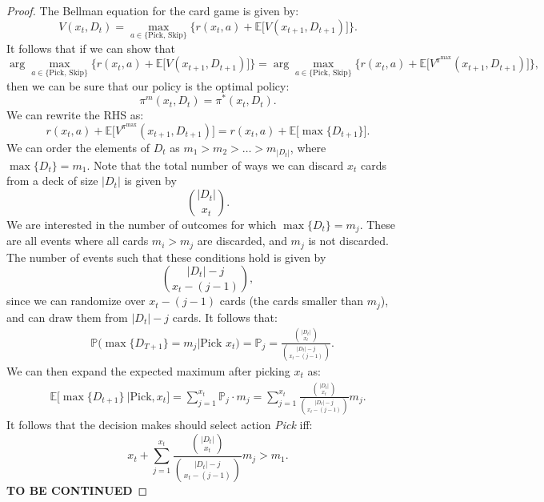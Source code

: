 \documentclass{article}
\begin{document}
\begin{proof}
    The Bellman equation for the card game is given by:
    \begin{equation}
        V(x_t, D_t) =  \max_{a \in \{\text{Pick, Skip}\}}\Big\{r(x_t,a) + \mathbb{E}\Big[V(x_{t+1}, D_{t+1})\Big]\Big\}.
    \end{equation}
    It follows that if we can show that
    \begin{equation}
        \arg \max_{a \in \{\text{Pick, Skip}\}}\Big\{r(x_t,a) + \mathbb{E}\Big[V(x_{t+1}, D_{t+1})\Big]\Big\} = \arg \max_{a \in \{\text{Pick, Skip}\}}\Big\{r(x_t,a) + \mathbb{E}\Big[V^{\pi^{\max}}(x_{t+1}, D_{t+1})\Big]\Big\},
    \end{equation}
    then  we can be sure that our policy is the optimal policy:
    \begin{equation}
        \pi^m(x_t, D_t) = \pi^*(x_t, D_t).
    \end{equation}
    We can rewrite the RHS as:
    \begin{equation}
        r(x_t,a) + \mathbb{E}\Big[V^{\pi^{\max}}(x_{t+1}, D_{t+1})\Big] = r(x_t,a) + \mathbb{E}\big[\max\{D_{t+1}\}\big].
    \end{equation}
    We can order the elements of $D_t$ as $m_1 > m_2 > \dots > m_{|D_t|}$, where $\max\{D_t\} = m_1$.
    Note that the total number of ways we can discard $x_t$ cards from a deck of size $|D_t|$ is given by
    \begin{equation}
        \binom{|D_t|}{x_t}.
    \end{equation}
    We are interested in the number of outcomes for which $\max\{D_t\}=m_j$. These are all events where all cards $m_i>m_j$ are discarded, and $m_j$ is not discarded. The number of events such that these conditions hold is given by
    \begin{equation}
        \binom{|D_t|-j}{x_t-(j-1)},
    \end{equation}
    since we can randomize over $x_t-(j-1)$ cards (the cards smaller than $m_j$), and can draw them from $|D_t|-j$ cards. It follows that:
    \begin{align}
         & \mathbb{P}\Big(\max\{D_{T+1}\}  = m_j \big| \text{Pick } x_t\Big) = \mathbb{P}_j  = \frac{\binom{|D_t|}{x_t}}{\binom{|D_t|-j}{x_t-(j-1)}} .
    \end{align}
    We can then expand the expected maximum after picking $x_t$ as:
    \begin{align}
        \mathbb{E}\big[\max\{D_{t+1}\} \ | \text{Pick}, x_t\big] = \sum^{x_t}_{j=1} \mathbb{P}_j\cdot m_j = \sum^{x_t}_{j=1} \frac{\binom{|D_t|}{x_t}}{\binom{|D_t|-j}{x_t-(j-1)}}  m_j.
    \end{align}
    It follows that the decision makes should select action \textit{Pick} iff:
    \begin{equation}
        x_t+ \sum^{x_t}_{j=1} \frac{\binom{|D_t|}{x_t}}{\binom{|D_t|-j}{x_t-(j-1)}}  m_j > m_1.
    \end{equation}
    \textbf{TO BE CONTINUED}





\end{proof}
\end{document}
